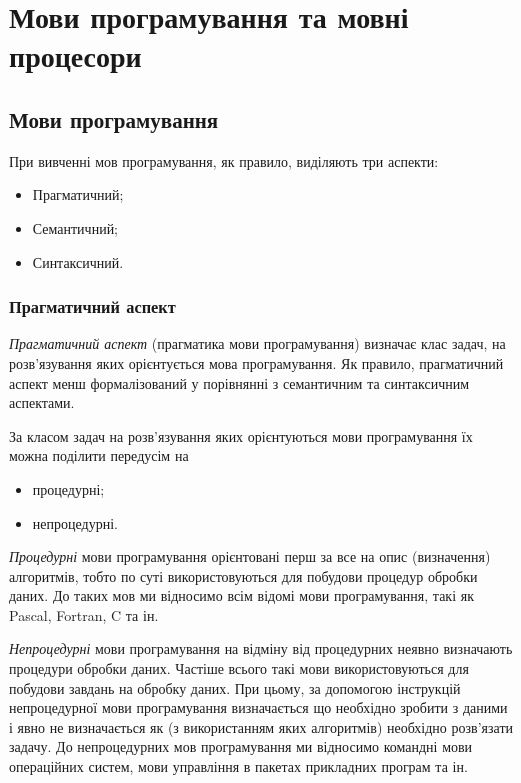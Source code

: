 \setcounter{section}{0}

\section{Мови програмування та мовні процесори} 

\subsection{Мови програмування}

При вивченні мов програмування, як правило, виділяють три аспекти:
\begin{itemize}
	\item Прагматичний;
	\item Семантичний;
	\item Синтаксичний.
\end{itemize}

\subsubsection{Прагматичний аспект}

\textit{Прагматичний аспект} (прагматика мови програмування) визначає клас задач, на
розв'язування яких орієнтується мова програмування. Як правило, прагматичний аспект
менш формалізований у порівнянні з семантичним та синтаксичним аспектами. \medskip

За класом задач на розв'язування яких орієнтуються мови програмування 
їх можна поділити передусім на 
\begin{itemize}
	\item процедурні;
	\item непроцедурні.
\end{itemize}

\textit{Процедурні} мови програмування орієнтовані перш за все на опис
(визначення) алгоритмів, тобто по суті використовуються для побудови процедур
обробки даних. До таких мов ми відносимо всім відомі мови програмування, такі
як Pascal, Fortran, C та ін. \medskip

\textit{Непроцедурні} мови програмування на відміну від процедурних неявно
визначають процедури обробки даних. Частіше всього такі мови
використовуються для побудови завдань на обробку даних. При цьому, за
допомогою інструкцій непроцедурної мови програмування визначається що
необхідно зробити з даними і явно не визначається як (з використанням яких
алгоритмів) необхідно розв'язати задачу. До непроцедурних мов програмування
ми відносимо командні мови операційних систем, мови управління в пакетах
прикладних програм та ін. \medskip

